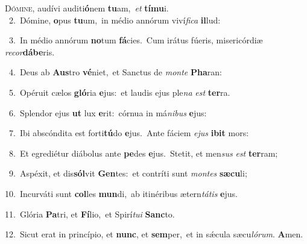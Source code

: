 \lettrine{\initial\textcolor{\initialcolor}{D}}{ómine,} audívi auditi\-\textbf{ó}\-nem \textbf{tu}\-am,~\star \textit{et} \textbf{tí}\-\textbf{mu}i.\\
{\numbfont\textcolor{\numbcolor}{~2.}}~Dómine, \textbf{o}\-pus \textbf{tu}\-um,~\star in médio annórum viví\-\textit{fi}\-\textit{ca} \textbf{il}\-lud:\par
{\numbfont\textcolor{\numbcolor}{~3.}}~In médio annórum \textbf{no}\-tum \textbf{fá}\-cies.~\star Cum irátus fúeris, misericórdiæ \textit{re}\-\textit{cor}\textbf{dá}\textbf{be}ris.\par
{\numbfont\textcolor{\numbcolor}{~4.}}~Deus ab \textbf{Aus}\-tro \textbf{vé}\-niet,~\star et Sanctus de \textit{mon}\-\textit{te} \textbf{Pha}\-ran:\par
{\numbfont\textcolor{\numbcolor}{~5.}}~Opéruit cælos \textbf{gló}\-ria \textbf{e}\-jus:~\star et laudis ejus ple\textit{na} \textit{est} \textbf{ter}\-ra.\par
{\numbfont\textcolor{\numbcolor}{~6.}}~Splendor ejus \textbf{ut} lux \textbf{e}\-rit:~\star córnua in má\-\textit{ni}\-\textit{bus} \textbf{e}\-jus:\par
{\numbfont\textcolor{\numbcolor}{~7.}}~Ibi abscóndita est forti\-\textbf{tú}\-do \textbf{e}\-jus.~\star Ante fáciem \textit{e}\-\textit{jus} \textbf{i}\-\textbf{bit} mors:\par
{\numbfont\textcolor{\numbcolor}{~8.}}~Et egrediétur diábolus ante \textbf{pe}\-des \textbf{e}\-jus.~\star Stetit, et men\textit{sus} \textit{est} \textbf{ter}\-ram;\par
{\numbfont\textcolor{\numbcolor}{~9.}}~Aspéxit, et dis\-\textbf{sól}\-vit \textbf{Gen}\-tes:~\star et contríti sunt \textit{mon}\-\textit{tes} \textbf{sæ}\-\textbf{cu}li;\par
{\numbfont\textcolor{\numbcolor}{10.}}~Incurváti sunt \textbf{col}\-les \textbf{mun}\-di,~\star ab itinéribus ætern\-\textit{tá}\-\textit{tis} \textbf{e}\-jus.\par
{\numbfont\textcolor{\numbcolor}{11.}}~Glória \textbf{Pa}\-tri, et \textbf{Fí}\-lio,~\star et Spirí\-\textit{tu}\-\textit{i} \textbf{Sanc}\-to.\par
{\numbfont\textcolor{\numbcolor}{12.}}~Sicut erat in princípio, et \textbf{nunc}\-, et \textbf{sem}\-per,~\star et in sǽcula sæcu\-\textit{ló}\-\textit{rum}. \textbf{A}\-men.\par
